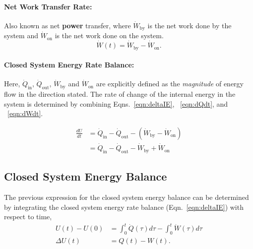 \paragraph{Net Work Transfer Rate:} Also known as net \textbf{power} transfer, where $\dot{W}_{\text{by}}$ is the net work done by the system and $\dot{W}_{\text{on}}$ is the net work done on the system.
\begin{equation}
\label{eqn:dWdt}
\dot{W}(t)=\dot{W}_{\text{by}}-\dot{W}_{\text{on}}.
\end{equation}

\paragraph{Closed System Energy Rate Balance:} Here, $\dot{Q}_{\text{in}}$, $\dot{Q}_{\text{out}}$, $\dot{W}_{\text{by}}$ and $\dot{W}_{\text{on}}$ are explicitly defined as the \emph{magnitude} of energy flow in the direction stated. The rate of change of the internal energy in the system is determined by combining Eqns.~\ref{eqn:deltaIE}, ~\ref{eqn:dQdt}, and ~\ref{eqn:dWdt}.

\begin{equation}
\begin{split}
\frac{dU}{dt}&=\dot{Q}_{\text{in}}-\dot{Q}_{\text{out}}-(\dot{W}_{\text{by}}-\dot{W}_{\text{on}})\\
&=\dot{Q}_{\text{in}}-\dot{Q}_{\text{out}}-\dot{W}_{\text{by}}+\dot{W}_{\text{on}}
\end{split}
\end{equation}


\subsection{Closed System Energy Balance}
The previous expression for the closed system energy balance can be determined by integrating the closed system energy rate balance (Eqn.~\ref{eqn:deltaIE}) with respect to time,
\begin{equation}
\begin{split}
\label{eqn:intUdt}
U(t)-U(0)&=\int_0^t \dot{Q}(\tau)d\tau-\int_0^t \dot{W}(\tau)d\tau\\
\Delta U(t)&=Q(t)-W(t).
\end{split}
\end{equation}

